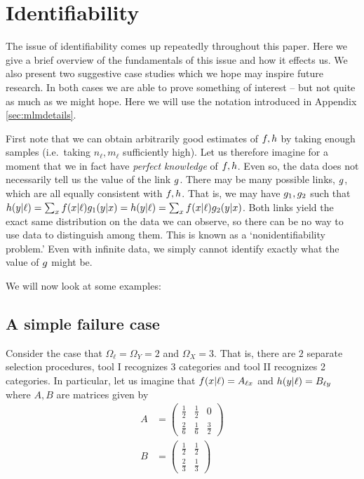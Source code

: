 \section{Identifiability}

\label{sec:casestudies}

The issue of identifiability comes up repeatedly throughout this paper.  Here we give a brief overview of the fundamentals of this issue and how it effects us.  We also present two suggestive case studies which we hope may inspire future research.  In both cases we are able to prove something of interest -- but not quite as much as we might hope.  Here we will use the notation introduced in Appendix \ref{sec:mlmdetails}.

First note that we can obtain arbitrarily good estimates of $f,h$ by taking enough samples (i.e.\ taking $n_\ell,m_\ell$ sufficiently high).  Let us therefore imagine for a moment that we in fact have \emph{perfect knowledge} of $f,h$.  Even so, the data does not necessarily tell us the value of the link $g$.  There may be many possible links, $g$, which are all equally consistent with $f,h$.  That is, we may have $g_1,g_2$ such that $h(y|\ell)=\sum_x f(x|\ell)g_1(y|x)=h(y|\ell)=\sum_x f(x|\ell)g_2(y|x)$.  Both links yield the exact same distribution on the data we can observe, so there can be no way to use data to distinguish among them.  This is known as a `nonidentifiability problem.'  Even with infinite data, we simply cannot identify exactly what the value of $g$ might be.

We will now look at some examples:

\subsection{A simple failure case}

Consider the case that $\Omega_\ell = \Omega_Y = 2$ and $\Omega_X=3$.  That is, there are $2$ separate selection procedures, tool I recognizes 3 categories and tool II recognizes 2 categories.  In particular, let us imagine that $f(x|\ell)=A_{\ell x}$ and $h(y|\ell)=B_{\ell y}$ where $A,B$ are matrices given by 
%
\begin{align*}
A&=\left(\begin{array}{ccc}
\frac{1}{2} & \frac{1}{2} & 0\\
\frac{2}{6} & \frac{1}{6} & \frac{3}{2}
\end{array}\right) \\
B&=\left(\begin{array}{cc}
\frac{1}{2} & \frac{1}{2}\\
\frac{2}{3} & \frac{1}{3}
\end{array}\right)
\end{align*}

